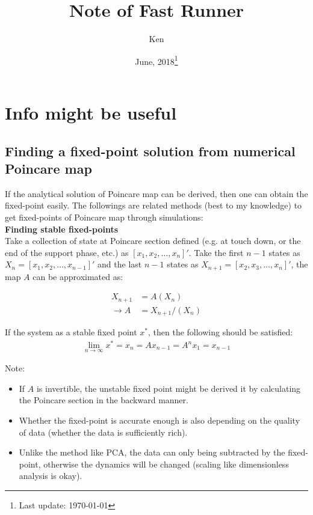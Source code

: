 \documentclass{article}
\title{Note of Fast Runner}
\author{Ken}
\date{June, 2018\footnote{Last update: \today}}
\begin{document}
\maketitle













\section{Info might be useful}
\subsection{Finding a fixed-point solution from numerical Poincare map}
If the analytical solution of Poincare map can be derived, then one can obtain the fixed-point easily. The followings are related methods (best to my knowledge) to get fixed-points of Poincare map through simulations:\\

\noindent \textbf{Finding stable fixed-points}\\
Take a collection of state at Poincare section defined (e.g. at touch down, or the end of the support phase, etc.) as $[x_1,x_2,\ldots,x_n]'$. Take the first $n-1$ states as $X_n = [x_1,x_2,\ldots,x_{n-1}]'$ and the last $n-1$ states as $X_{n+1} = [x_2,x_3,\ldots,x_n]'$, the map $A$ can be approximated as:

\begin{align*}
X_{n+1} &= A(X_{n})\\
\rightarrow A &= X_{n+1}/(X_{n})
\end{align*}

\noindent If the system as a stable fixed point $x^*$, then the following should be satisfied:
\begin{align*}
\lim_{n\to\infty} x^* = x_n = Ax_{n-1} = A^nx_1 = x_{n-1}
\end{align*}

\noindent  Note:
\begin{itemize}
\item If $A$ is invertible, the unstable fixed point might be derived it by calculating the Poincare section in the  backward manner. 
\item Whether the fixed-point is accurate enough is also depending on the quality of data (whether the data is sufficiently rich).
\item Unlike the method like PCA, the data can only being subtracted by the fixed-point, otherwise the dynamics will be changed (scaling like dimensionless analysis is okay).
\end{itemize}
\end{document}
